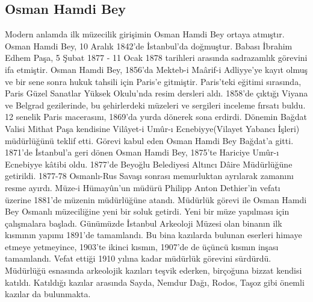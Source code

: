 \subsection{Osman Hamdi Bey}
\indent\indent Modern anlamda ilk müzecilik girişimin Osman Hamdi Bey ortaya atmıştır. Osman Hamdi Bey, 10 Aralık 1842'de İstanbul'da doğmuştur. Babası İbrahim Edhem Paşa, 5 Şubat 1877 - 11 Ocak 1878 tarihleri arasında sadrazamlık görevini ifa etmiştir. Osman Hamdi Bey, 1856'da Mekteb-i Ma\^{a}rif-i Adliyye'ye kayıt olmuş ve bir sene sonra hukuk tahsili için Paris'e gitmiştir. Paris'teki eğitimi sırasında, Paris Güzel Sanatlar Yüksek Okulu'nda resim dersleri aldı. 1858'de çıktığı Viyana ve Belgrad gezilerinde, bu şehirlerdeki müzeleri ve sergileri inceleme fırsatı buldu. 12 senelik Paris macerasını, 1869'da yurda dönerek sona erdirdi. Dönemin Bağdat Valisi Mithat Paşa kendisine Vil\^{a}yet-i Um\^{u}r-ı Ecnebiyye(Vilayet Yabancı İşleri) müdürlüğünü teklif etti. Görevi kabul eden Osman Hamdi Bey Bağdat'a gitti. 1871'de İstanbul'a geri dönen Osman Hamdi Bey, 1875'te Hariciye Um\^{u}r-ı Ecnebiyye k\^{a}tibi oldu. 1877'de Beyoğlu Belediyesi Altıncı D\^{a}ire Müdürlüğüne getirildi. 1877-78 Osmanlı-Rus Savaşı sonrası memurluktan ayrılarak zamanını resme ayırdı. Müze-i Hümay\^{u}n'un müdürü Philipp Anton Dethier'in vefatı üzerine 1881'de müzenin müdürlüğüne atandı.\newline
\indent Müdürlük görevi ile Osman Hamdi Bey Osmanlı müzeciliğine yeni bir soluk getirdi. Yeni bir müze yapılması için çalışmalara başladı. Günümüzde İstanbul Arkeoloji Müzesi olan binanın ilk kısmının yapımı 1891'de tamamlandı. Bu bina kazılarda bulunan eserleri himaye etmeye yetmeyince, 1903'te ikinci kısmın, 1907'de de üçüncü kısmın inşası tamamlandı. Vefat ettiği 1910 yılına kadar müdürlük görevini sürdürdü. Müdürlüğü esnasında arkeolojik kazıları teşvik ederken, birçoğuna bizzat kendisi katıldı. Katıldığı kazılar arasında Sayda, Nemdur Dağı, Rodos, Taşoz gibi önemli kazılar da bulunmakta.\cite{dia_1}